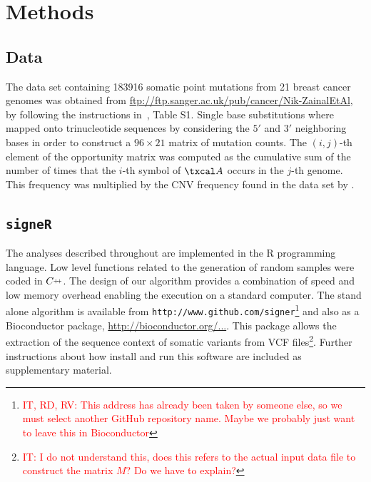 \documentclass{bioinfo}
\newcommand{\CC}{C\nolinebreak\hspace{-.05em}\raisebox{.4ex}{\tiny +}\nolinebreak\hspace{-.15em}\raisebox{.4ex}{\tiny +}}
\begin{document}
\section{Methods}
\subsection{Data} The data set containing 183916 somatic point
mutations from 21 breast cancer genomes was obtained from
\url{ftp://ftp.sanger.ac.uk/pub/cancer/Nik-ZainalEtAl}, by
following the instructions in~\cite{NCell}, Table S1. Single base 
substitutions where mapped onto trinucleotide sequences by considering
the $5'$ and $3'$ neighboring bases in order to construct a $96\times
21$ matrix of mutation counts. The $(i,j)$-th element of the
opportunity matrix was computed as the cumulative sum of the number of
times that the $i$-th symbol of $\txcal A$ occurs in the $j$-th
genome. This frequency was multiplied by the CNV frequency
found in the data set by \cite{NCell}.

\subsection{\texttt{signeR}}
The analyses described throughout are implemented in the R programming
language. Low level functions related to the generation of random
samples were coded in $\CC$. The design of our algorithm provides a
combination of speed and low memory overhead enabling the execution on
a standard computer. The stand alone algorithm is available from
\verb~http://www.github.com/signer~\footnote{\textcolor{red}{IT, RD,
  RV: This address has already been taken by someone else, so we 
  must  select another GitHub repository name. Maybe we probably
  just want to leave this in Bioconductor}} and 
also as a Bioconductor package, \url{http://bioconductor.org/...}. 
This package allows the extraction of the sequence context of somatic
variants from VCF files\footnote{\textcolor{red}{IT: I do not
understand this, does this refers to the actual input data file to
construct the matrix $M$? Do we have to explain?}}. Further
instructions about how install and run this software are included as 
supplementary material.
\end{document}
